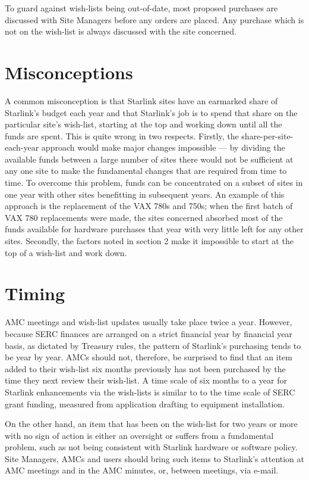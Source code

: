 To guard against wish-lists being out-of-date,
most proposed purchases are discussed with
Site Managers before any orders are placed.  Any purchase
which is not on the wish-list is always discussed with the site concerned.
 
\section {Misconceptions}
 
A common misconception is that Starlink sites have an earmarked share
of Starlink's budget each year and that Starlink's job is to spend that share
on the particular site's wish-list, starting at the top and working down
until all the funds are spent.  This is quite wrong in two respects.  Firstly,
the share-per-site-each-year approach would make major changes impossible ---
by dividing the available funds between a large number of sites there would
not be sufficient at any one site to make the fundamental changes that are
required from time to time.  To overcome this problem, funds can be
concentrated on a subset of sites in one year with other sites benefitting
in subsequent years.
An example of this approach is the replacement of the VAX 780s and 750s;
when the first batch of VAX 780 replacements were made, the sites
concerned absorbed most of the funds available for hardware purchases that
year with very little left for any other sites.  
Secondly, the factors noted in section 2 make it impossible
to start at the top of a wish-list and work down.
 
\section {Timing}
 
AMC meetings and wish-list updates usually take place twice a year.
However, because SERC finances are arranged on a strict financial year by
financial year basis, as dictated by Treasury rules, the pattern of Starlink's
purchasing tends to be year by year.  AMCs should not, therefore, be surprised
to find that an item added to their wish-list six months previously
has not been purchased by the time they next review their wish-list.
A time scale of six months to a year for Starlink enhancements via the
wish-lists is similar to to the time scale of SERC grant funding, measured
from application drafting to equipment installation.
 
On the other hand, an item that has been on the wish-list for
two years or more with no sign of action is either an oversight or suffers
from a fundamental problem, such as not being consistent with Starlink
hardware or software policy.  Site Managers, AMCs and users should bring
such items to Starlink's attention at AMC meetings and in the AMC minutes,
or, between meetings, via e-mail.

